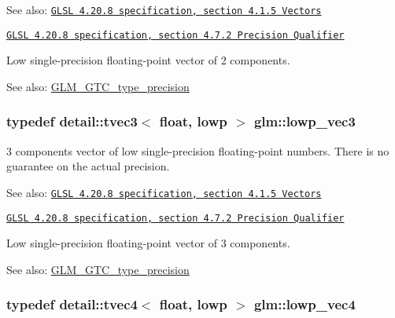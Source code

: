 \begin{Desc}
\item[See also:]\href{http://www.opengl.org/registry/doc/GLSLangSpec.4.20.8.pdf}{\tt GLSL 4.20.8 specification, section 4.1.5 Vectors} 

\href{http://www.opengl.org/registry/doc/GLSLangSpec.4.20.8.pdf}{\tt GLSL 4.20.8 specification, section 4.7.2 Precision Qualifier}\end{Desc}
Low single-precision floating-point vector of 2 components. \begin{Desc}
\item[See also:]\hyperlink{group__gtc__type__precision}{GLM\_\-GTC\_\-type\_\-precision} \end{Desc}
\hypertarget{group__core__precision_g062795097526e2758d34cb38387dd82d}{
\subsubsection[lowp\_\-vec3]{\setlength{\rightskip}{0pt plus 5cm}typedef detail::tvec3$<$ float, lowp $>$ {\bf glm::lowp\_\-vec3}}}
\label{group__core__precision_g062795097526e2758d34cb38387dd82d}


3 components vector of low single-precision floating-point numbers. There is no guarantee on the actual precision.

\begin{Desc}
\item[See also:]\href{http://www.opengl.org/registry/doc/GLSLangSpec.4.20.8.pdf}{\tt GLSL 4.20.8 specification, section 4.1.5 Vectors} 

\href{http://www.opengl.org/registry/doc/GLSLangSpec.4.20.8.pdf}{\tt GLSL 4.20.8 specification, section 4.7.2 Precision Qualifier}\end{Desc}
Low single-precision floating-point vector of 3 components. \begin{Desc}
\item[See also:]\hyperlink{group__gtc__type__precision}{GLM\_\-GTC\_\-type\_\-precision} \end{Desc}
\hypertarget{group__core__precision_g706ad1296c1cdcbd26c815fbb0f3f846}{
\subsubsection[lowp\_\-vec4]{\setlength{\rightskip}{0pt plus 5cm}typedef detail::tvec4$<$ float, lowp $>$ {\bf glm::lowp\_\-vec4}}}
\label{group__core__precision_g706ad1296c1cdcbd26c815fbb0f3f846}


